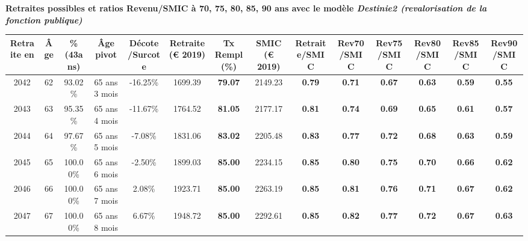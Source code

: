  \vspace{0.1cm} 
{\bf \noindent Retraites possibles et ratios Revenu/SMIC à 70, 75, 80, 85, 90 ans avec le modèle \emph{Destinie2 (revalorisation de la fonction publique)}}  
 
\begin{adjustbox}{max width=\textwidth} 
\begin{tabular}[htb]{|c|c||c|c|c||c|c||c||c|c|c|c|c|c|} 
\hline 
 Retraite en &  Âge &  \%(43ans) &  Âge pivot &  Décote/Surcote &  Retraite (\euro{} 2019) &  Tx Rempl(\%) &  SMIC (\euro{} 2019) &  Retraite/SMIC &  Rev70/SMIC &  Rev75/SMIC &  Rev80/SMIC &  Rev85/SMIC &  Rev90/SMIC \\ 
\hline \hline 
 2042 &  62 &  93.02\% &  65 ans 3 mois &  -16.25\% &  1699.39 &  {\bf 79.07} &  2149.23 &  {\bf {\color{red} 0.79}} &  {\bf {\color{red} 0.71}} &  {\bf {\color{red} 0.67}} &  {\bf {\color{red} 0.63}} &  {\bf {\color{red} 0.59}} &  {\bf {\color{red} 0.55}} \\ 
\hline 
 2043 &  63 &  95.35\% &  65 ans 4 mois &  -11.67\% &  1764.52 &  {\bf 81.05} &  2177.17 &  {\bf {\color{red} 0.81}} &  {\bf {\color{red} 0.74}} &  {\bf {\color{red} 0.69}} &  {\bf {\color{red} 0.65}} &  {\bf {\color{red} 0.61}} &  {\bf {\color{red} 0.57}} \\ 
\hline 
 2044 &  64 &  97.67\% &  65 ans 5 mois &  -7.08\% &  1831.06 &  {\bf 83.02} &  2205.48 &  {\bf {\color{red} 0.83}} &  {\bf {\color{red} 0.77}} &  {\bf {\color{red} 0.72}} &  {\bf {\color{red} 0.68}} &  {\bf {\color{red} 0.63}} &  {\bf {\color{red} 0.59}} \\ 
\hline 
 2045 &  65 &  100.00\% &  65 ans 6 mois &  -2.50\% &  1899.03 &  {\bf 85.00} &  2234.15 &  {\bf {\color{red} 0.85}} &  {\bf {\color{red} 0.80}} &  {\bf {\color{red} 0.75}} &  {\bf {\color{red} 0.70}} &  {\bf {\color{red} 0.66}} &  {\bf {\color{red} 0.62}} \\ 
\hline 
 2046 &  66 &  100.00\% &  65 ans 7 mois &  2.08\% &  1923.71 &  {\bf 85.00} &  2263.19 &  {\bf {\color{red} 0.85}} &  {\bf {\color{red} 0.81}} &  {\bf {\color{red} 0.76}} &  {\bf {\color{red} 0.71}} &  {\bf {\color{red} 0.67}} &  {\bf {\color{red} 0.62}} \\ 
\hline 
 2047 &  67 &  100.00\% &  65 ans 8 mois &  6.67\% &  1948.72 &  {\bf 85.00} &  2292.61 &  {\bf {\color{red} 0.85}} &  {\bf {\color{red} 0.82}} &  {\bf {\color{red} 0.77}} &  {\bf {\color{red} 0.72}} &  {\bf {\color{red} 0.67}} &  {\bf {\color{red} 0.63}} \\ 
\hline 
\hline 
\end{tabular} 
\end{adjustbox} 
 
